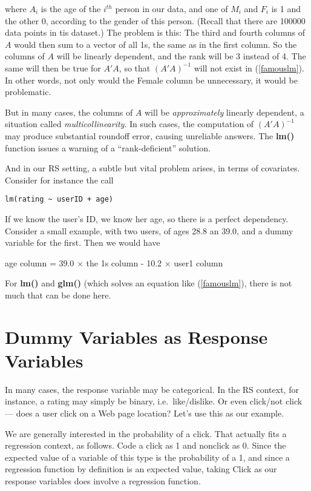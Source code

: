 where $A_i$ is the age of the $i^{th}$ person in our data, and one of
$M_{i}$ and $F_{i}$ is 1 and the other 0, according to the gender of
this person.  (Recall that there are 100000 data points in tis dataset.)
The problem is this:  The third and fourth columns of $A$ would then sum
to a vector of all 1s, the same as in the first column.  So the columns
of $A$ will be linearly dependent, and the rank will be 3 instead of 4.
The same will then be true for $A'A$, so that $(A'A)^{-1}$ will not
exist in (\ref{famouslm}).  In other words, not only would the Female
column be unnecessary, it would be problematic.

But in many cases, the columns of $A$ will be \textit{approximately}
linearly dependent, a situation called \textit{multicollinearity}.  In
such cases, the computation of $(A'A)^{-1}$ may produce substantial
roundoff error, causing unreliable answers.  The \textbf{lm()} function
issues a warning of a ``rank-deficient'' solution.

And in our RS setting, a subtle but vital problem arises, in terms of
covariates.  Consider for instance the call

\begin{lstlisting}
lm(rating ~ userID + age)
\end{lstlisting}

If we know the user's ID, we know her age, so there is a perfect
dependency.  Consider a small example, with two users, of ages 28.8 an
39.0, and a dummy variable for the first.  Then we would have

age column = 39.0 $\times$ the 1s column - 10.2 $\times$ user1 column

For \textbf{lm()} and \textbf{glm()} (which solves an equation like
(\ref{famouslm}), there is not much that can be done here. 

\section{Dummy Variables as Response Variables}
\label{logit}

In many cases, the response variable may be categorical.  In the RS
context, for instance, a rating may simply be binary, i.e.\
like/dislike.  Or even click/not click --- does a user click on a Web page
location?  Let's use this as our example.

We are generally interested in the probability of a click.  That
actually fits a regression context, as follows.  Code a click as 1 and
nonclick as 0.  Since the expected value of a variable of this type is
the probability of a 1, and since a regression function by definition
is an expected value, taking Click as our response variables does
involve a regression function.

